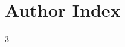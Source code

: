 \documentclass[a4paper,fleqn]{article}
\begin{document}

\ifdefined\HCode
  \newcommand{\BibAnnote}[1]{
    {\par~\par
      \setlength{\parskip}{0pt}
      \setlength{\parindent}{1.5em}
      #1\par\medskip}}
\else
  \newcommand{\BibAnnote}[1]{
    {\par\medskip
      \setlength{\parskip}{0pt}
      \setlength{\parindent}{1.5em}
      {\small #1\par}\medskip}}
\fi




\pagebreak[4]
\section*{Author Index}\nopagebreak[4]
\begin{multicols}{3}
  \printauthorindex
\end{multicols}
\end{document}
